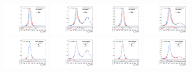 \begin{figure}[htbp]
  \centering
  \includegraphics[width=0.21\textwidth]{fig/uncertainties/systs_res_e_HP_nobb_LDy_scaleWY_ProjY.pdf}
  \includegraphics[width=0.21\textwidth]{fig/uncertainties/systs_res_e_LP_nobb_LDy_scaleWY_ProjY.pdf}
  \includegraphics[width=0.21\textwidth]{fig/uncertainties/systs_res_e_HP_nobb_HDy_scaleWY_ProjY.pdf}
  \includegraphics[width=0.21\textwidth]{fig/uncertainties/systs_res_e_LP_nobb_HDy_scaleWY_ProjY.pdf}\\
  \includegraphics[width=0.21\textwidth]{fig/uncertainties/systs_res_e_HP_nobb_LDy_resWY_ProjY.pdf}
  \includegraphics[width=0.21\textwidth]{fig/uncertainties/systs_res_e_LP_nobb_LDy_resWY_ProjY.pdf}
  \includegraphics[width=0.21\textwidth]{fig/uncertainties/systs_res_e_HP_nobb_HDy_resWY_ProjY.pdf}
  \includegraphics[width=0.21\textwidth]{fig/uncertainties/systs_res_e_LP_nobb_HDy_resWY_ProjY.pdf}\\

\end{figure}
